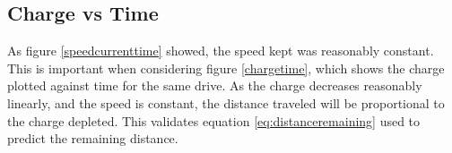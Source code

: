 
\subsection{Charge vs Time}

As figure \ref{speedcurrenttime} showed, the speed kept was reasonably constant. This is important when considering figure \ref{chargetime}, which shows the charge plotted against time for the same drive. As the charge decreases reasonably linearly, and the speed is constant, the distance traveled will be proportional to the charge depleted. This validates equation \ref{eq:distanceremaining} used to predict the remaining distance.



